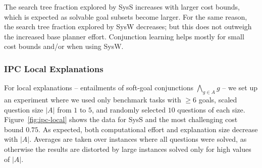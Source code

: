 The search tree fraction explored by SysS increases with larger cost
bounds, which is expected as solvable goal subsets become larger. For
the same reason, the search tree fraction explored by SysW decreases;
but this does not outweigh the increased base planner
effort. Conjunction learning helps mostly for small cost bounds and/or
when using SysW.
%
%



\subsubsection{IPC Local Explanations}

For local explanations -- entailments of soft-goal conjunctions
$\bigwedge_{g \in A} g$ -- we set up an experiment where we used only
benchmark tasks with $\geq 6$ goals, scaled question size $|A|$ from
$1$ to $5$, and randomly selected $10$ questions of each
size. Figure~\ref{fig:ipc-local} shows the data for SysS and the most
challenging cost bound $0.75$.
%
As expected, both computational effort and explanation size decrease
with $|A|$.
%
Averages are taken over instances where all questions were solved, as
otherwise the results are distorted by large instances solved only for
high values of $|A|$.

